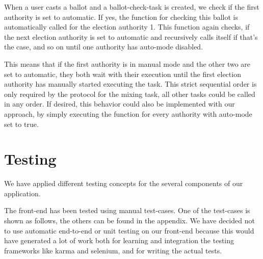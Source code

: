When a user casts a ballot and a ballot-check-task is created, we check if the first authority is set to automatic. If yes, the function for checking this ballot is automatically called for the election authority 1. This function again checks, if the next election authority is set to automatic and recursively calls itself if that's the case, and so on until one authority has auto-mode disabled.

This means that if the first authority is in manual mode and the other two are set to automatic, they both wait with their execution until the first election authority has manually started executing the task. This strict sequential order is only required by the protocol for the mixing task, all other tasks could be called in any order. If desired, this behavior could also be implemented with our approach, by simply executing the function for every authority with auto-mode set to true.

\section{Testing}
We have applied different testing concepts for the several components of our application.

The front-end has been tested using manual test-cases. One of the test-cases is shown as follows, the others can be found in the appendix. We have decided not to use automatic end-to-end or unit testing on our front-end because this would have generated a lot of work both for learning and integration the testing frameworks like karma and selenium, and for writing the actual tests. 

